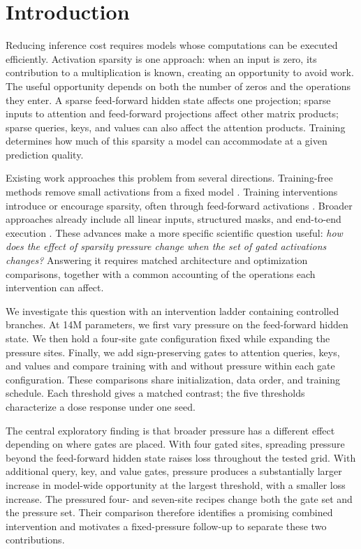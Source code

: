 \section{Introduction}
\label{sec:introduction}
Reducing inference cost requires models whose computations can be executed
efficiently. Activation sparsity is one approach: when an input is zero, its
contribution to a multiplication is known, creating an opportunity to avoid
work. The useful opportunity depends on both the number of zeros and the
operations they enter. A sparse feed-forward hidden state affects one
projection; sparse inputs to attention and feed-forward projections affect
other matrix products; sparse queries, keys, and values can also affect the
attention products. Training determines how much of this sparsity a model can
accommodate at a given prediction quality.

Existing work approaches this problem from several directions. Training-free
methods remove small activations from a fixed model
\citep{liu2024teal,lee2024cats}. Training interventions introduce or encourage
sparsity, often through feed-forward activations
\citep{mirzadeh2023relu,song2024prosparse,zhang2024exploring}.
Broader approaches already include all linear inputs, structured masks, and
end-to-end execution \citep{wang2024qsparse,you2025spark,cetin2026sparser}.
These advances make a more specific scientific question useful:
\emph{how does the effect of sparsity pressure change when the set of gated
activations changes?} Answering it requires matched architecture and
optimization comparisons, together with a common accounting of the operations
each intervention can affect.

We investigate this question with an intervention ladder containing controlled
branches. At 14M parameters, we first vary pressure on the feed-forward hidden
state. We then hold a four-site gate configuration fixed while expanding the
pressure sites. Finally, we add sign-preserving gates to attention queries,
keys, and values and compare training with and without pressure within each
gate configuration. These comparisons share initialization, data order, and
training schedule. Each threshold gives a matched contrast; the five
thresholds characterize a dose response under one seed.

The central exploratory finding is that broader pressure has a different effect depending
on where gates are placed. With four gated sites, spreading pressure beyond
the feed-forward hidden state raises loss throughout the tested grid. With
additional query, key, and value gates, pressure produces a substantially larger
increase in model-wide opportunity at the largest threshold, with a smaller
loss increase. The pressured four- and seven-site recipes change both the gate
set and the pressure set. Their comparison therefore identifies a promising
combined intervention and motivates a fixed-pressure follow-up to separate
these two contributions.

